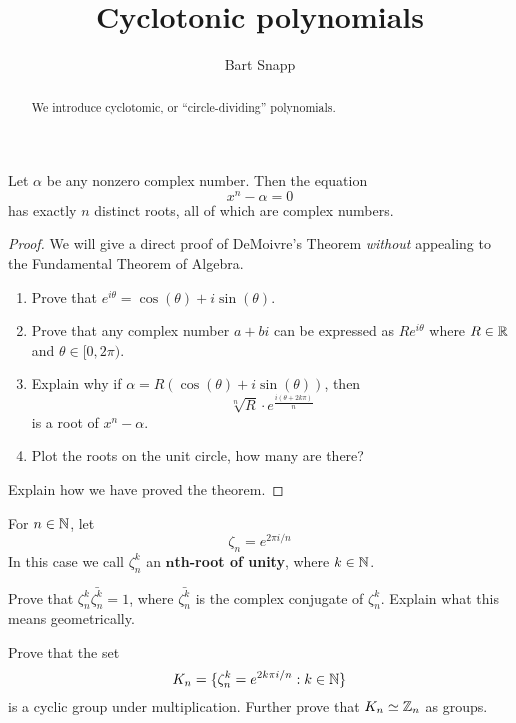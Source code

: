 \documentclass{ximera}
\author{Bart Snapp}
\title{Cyclotonic polynomials}
\begin{document}
\begin{abstract}
  We introduce cyclotomic, or ``circle-dividing'' polynomials.
\end{abstract}
\maketitle

\begin{theorem} 
Let $\alpha$ be any nonzero complex number. Then the equation
\[
x^n - \alpha = 0
\]
has exactly $n$ distinct roots, all of which are complex numbers.
\begin{proof} 
We will give a direct proof of DeMoivre's Theorem \textit{without}
appealing to the Fundamental Theorem of Algebra.
\begin{enumerate}
\item Prove that $e^{i \theta} = \cos(\theta) + i \sin(\theta)$.
\item Prove that any complex number $a + bi$ can be expressed as $R
  e^{i\theta}$ where $R\in \mathbb R$ and $\theta \in [0,2\pi)$.
\item Explain why if $\alpha = R(\cos(\theta) +i \sin(\theta))$, then 
\[
\sqrt[n]{R} \cdot  e^{\frac{i(\theta + 2k\pi)}{n}}
\]
is a root of $x^n - \alpha$.
\item Plot the roots on the unit circle, how many are there?
\end{enumerate}
Explain how we have proved the theorem.
\end{proof}
\end{theorem}


\begin{definition} 
For $n\in \mathbb N$, let 
\[
\zeta_n = e^{2\pi i/n}
\]
In this case we call $\zeta_n^k$ an \textbf{$\boldsymbol{n}$th-root of unity}, where $k\in
\mathbb N$.
\end{definition}

\begin{exercise} 
Prove that $\zeta_n^k\bar{\zeta_n^k} = 1$, where $\bar{\zeta_n^k}$ is
the complex conjugate of $\zeta_n^k$. Explain what this means
geometrically.
\end{exercise}

\begin{exercise}\label{E:KN} Prove that the set 
\[
K_n = \{\zeta_n^k = e^{2k\pi i/n}: k\in \mathbb N\}
\]
is a cyclic group under multiplication. Further prove that $K_n \simeq
\mathbb Z_n$ as groups.
\end{exercise}
\end{document}
